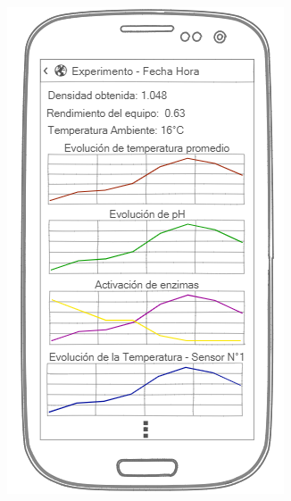    \begin{minipage}{0.95\textwidth}

        \centering
        \includegraphics[scale=0.7]{Anexo/MockUp/DetailExperimentActivity.jpg}
        \label{fig:MockUpDetailExperimentActivity}
    \end{minipage}
    
